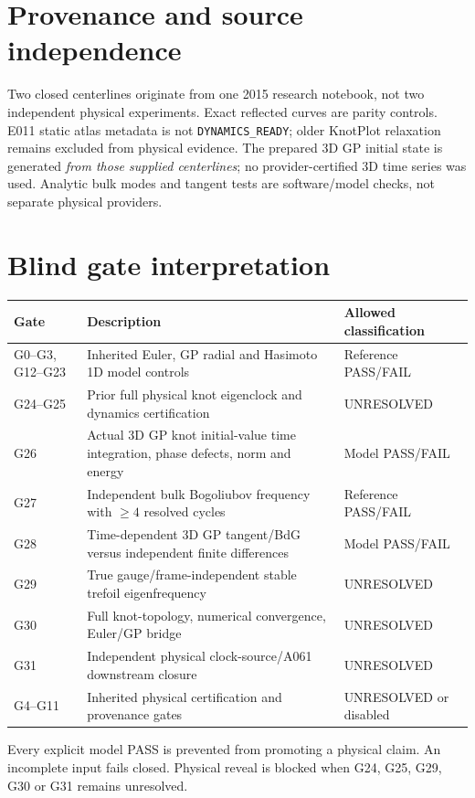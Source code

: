 \documentclass[10pt,a4paper]{article}
\begin{document}
\section{Provenance and source independence}
Two closed centerlines originate from one 2015 research notebook, not two independent physical experiments. Exact reflected curves are parity controls. E011 static atlas metadata is not \texttt{DYNAMICS\_READY}; older KnotPlot relaxation remains excluded from physical evidence. The prepared 3D GP initial state is generated \emph{from those supplied centerlines}; no provider-certified 3D time series was used. Analytic bulk modes and tangent tests are software/model checks, not separate physical providers.
\section{Blind gate interpretation}
\begin{longtable}{p{.14\linewidth}p{.58\linewidth}p{.22\linewidth}}\toprule
Gate&Description&Allowed classification\\\midrule
G0--G3, G12--G23&Inherited Euler, GP radial and Hasimoto 1D model controls&Reference PASS/FAIL\\
G24--G25&Prior full physical knot eigenclock and dynamics certification&UNRESOLVED\\
G26&Actual 3D GP knot initial-value time integration, phase defects, norm and energy&Model PASS/FAIL\\
G27&Independent bulk Bogoliubov frequency with $\ge4$ resolved cycles&Reference PASS/FAIL\\
G28&Time-dependent 3D GP tangent/BdG versus independent finite differences&Model PASS/FAIL\\
G29&True gauge/frame-independent stable trefoil eigenfrequency&UNRESOLVED\\
G30&Full knot-topology, numerical convergence, Euler/GP bridge&UNRESOLVED\\
G31&Independent physical clock-source/A061 downstream closure&UNRESOLVED\\
G4--G11&Inherited physical certification and provenance gates&UNRESOLVED or disabled\\\bottomrule\end{longtable}
Every explicit model PASS is prevented from promoting a physical claim. An incomplete input fails closed. Physical reveal is blocked when G24, G25, G29, G30 or G31 remains unresolved.
\end{document}

